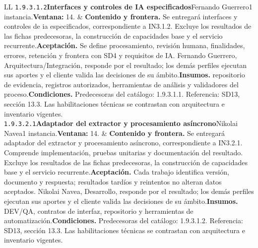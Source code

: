 \begin{longtable}{L{\tabcolsep\relax}L{\tabcolsep\relax}}
\texttt{1.\allowbreak{}9.\allowbreak{}3.\allowbreak{}1.\allowbreak{}2}\newline{}\textbf{Interfaces y controles de IA especificados}\newline{}Fernando Guerrero\newline{}1 instancia.\newline{}\textbf{Ventana:} 14. & \textbf{Contenido y frontera.} Se entregará interfaces y controles de ia especificados, correspondiente a IN3.1.2. Excluye los resultados de las fichas predecesoras, la construcción de capacidades base y el servicio recurrente.\newline{}\textbf{Aceptación.} Se define procesamiento, revisión humana, finalidades, errores, retención y frontera con SD4 y requisitos de IA. Fernando Guerrero, Arquitectura/Integración, responde por el resultado; los demás perfiles ejecutan sus aportes y el cliente valida las decisiones de su ámbito.\newline{}\textbf{Insumos.} repositorio de evidencia, registros autorizados, herramientas de análisis y validadores del proceso.\newline{}\textbf{Condiciones.} Predecesoras del catálogo: 1.9.3.1.1. Referencia: SD13, sección 13.3. Las habilitaciones técnicas se contrastan con arquitectura e inventario vigentes.\\\hline
\texttt{1.\allowbreak{}9.\allowbreak{}3.\allowbreak{}2.\allowbreak{}1}\newline{}\textbf{Adaptador del extractor y procesamiento asíncrono}\newline{}Nikolai Navea\newline{}1 instancia.\newline{}\textbf{Ventana:} 14. & \textbf{Contenido y frontera.} Se entregará adaptador del extractor y procesamiento asíncrono, correspondiente a IN3.2.1. Comprende implementación, pruebas unitarias y documentación del resultado. Excluye los resultados de las fichas predecesoras, la construcción de capacidades base y el servicio recurrente.\newline{}\textbf{Aceptación.} Cada trabajo identifica versión, documento y respuesta; resultados tardíos y reintentos no alteran datos aceptados. Nikolai Navea, Desarrollo, responde por el resultado; los demás perfiles ejecutan sus aportes y el cliente valida las decisiones de su ámbito.\newline{}\textbf{Insumos.} DEV/QA, contratos de interfaz, repositorio y herramientas de automatización.\newline{}\textbf{Condiciones.} Predecesoras del catálogo: 1.9.3.1.2. Referencia: SD13, sección 13.3. Las habilitaciones técnicas se contrastan con arquitectura e inventario vigentes.\\\hline

\end{longtable}

